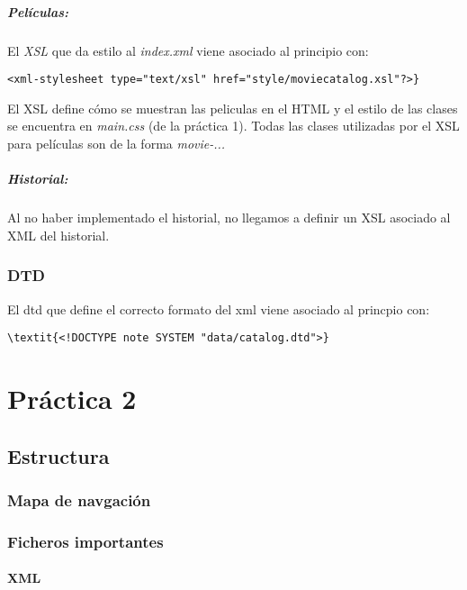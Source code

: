 \documentclass{apuntes}
\begin{document}
\paragraph{Películas: }
El \textit{XSL} que da estilo al \textit{index.xml} viene asociado al principio con:
\begin{verbatim}
<xml-stylesheet type="text/xsl" href="style/moviecatalog.xsl"?>}
\end{verbatim}

El XSL define cómo se muestran las peliculas en el HTML y el estilo de las clases se encuentra en \textit{main.css} (de la práctica 1). Todas las clases utilizadas por el XSL para películas son de la forma \textit{movie-...}


\paragraph{Historial: }
Al no haber implementado el historial, no llegamos a definir un XSL asociado al XML del historial.

\subsection{DTD}

El dtd que define el correcto formato del xml viene asociado al princpio con:

\begin{verbatim}
\textit{<!DOCTYPE note SYSTEM "data/catalog.dtd">}
\end{verbatim}


\chapter{Práctica 2}


\section{Estructura}

\subsection{Mapa de navgación}

\subsection{Ficheros importantes}

\subsubsection{XML}
\end{document}
